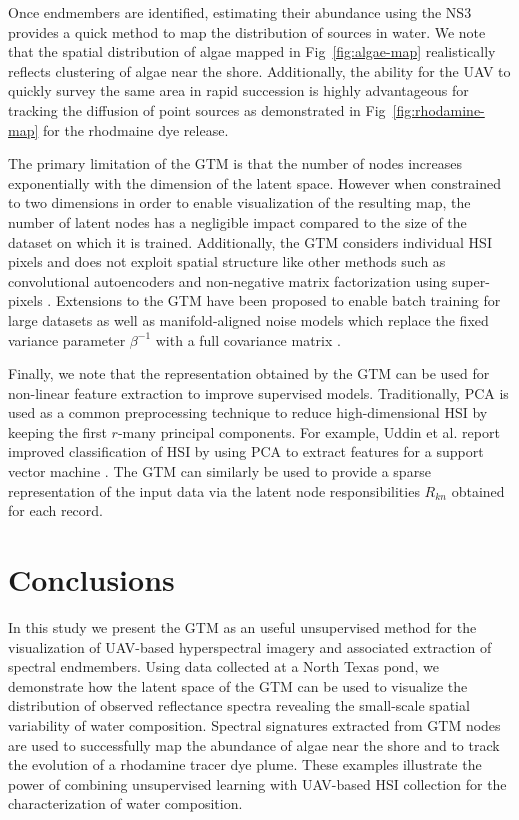 \documentclass[remotesensing,article,submit,pdftex,moreauthors]{Definitions/mdpi}
\begin{document}
Once endmembers are identified, estimating their abundance using the NS3 provides a quick method to map the distribution of sources in water. We note that the spatial distribution of algae mapped in Fig~\ref{fig:algae-map} realistically reflects clustering of algae near the shore. Additionally, the ability for the UAV to quickly survey the same area in rapid succession is highly advantageous for tracking the diffusion of point sources as demonstrated in Fig~\ref{fig:rhodamine-map} for the rhodmaine dye release.

The primary limitation of the GTM is that the number of nodes increases exponentially with the dimension of the latent space. However when constrained to two dimensions in order to enable visualization of the resulting map, the number of latent nodes has a negligible impact compared to the size of the dataset on which it is trained. Additionally, the GTM considers individual HSI pixels and does not exploit spatial structure like other methods such as convolutional autoencoders and non-negative matrix factorization using super-pixels \cite{palsson2020convolutional,Feng2022HyperspectralUB}. Extensions to the GTM have been proposed to enable batch training for large datasets as well as manifold-aligned noise models which replace the fixed variance parameter $\beta^{-1}$ with a full covariance matrix \cite{gtm-bishop-2}. 

Finally, we note that the representation obtained by the GTM can be used for non-linear feature extraction to improve supervised models. Traditionally, PCA is used as a common preprocessing technique to reduce high-dimensional HSI by keeping the first $r$-many principal components. For example, Uddin et al. report improved classification of HSI by using PCA to extract features for a support vector machine \cite{uddin2021pca}. The GTM can similarly be used to provide a sparse representation of the input data via the latent node responsibilities $R_{kn}$ obtained for each record. 

\section{Conclusions}

In this study we present the GTM as an useful unsupervised method for the visualization of UAV-based hyperspectral imagery and associated extraction of spectral endmembers. Using data collected at a North Texas pond, we demonstrate how the latent space of the GTM can be used to visualize the distribution of observed reflectance spectra revealing the small-scale spatial variability of water composition. Spectral signatures extracted from GTM nodes are used to successfully map the abundance of algae near the shore and to track the evolution of a rhodamine tracer dye plume. These examples illustrate the power of combining unsupervised learning with UAV-based HSI collection for the characterization of water composition.
\end{document}
